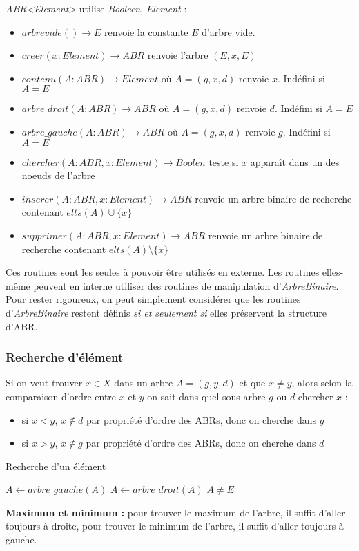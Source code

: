 \documentclass[../../../main.tex]{subfiles}
\begin{document}
\textit{ABR\textless{}Element\textgreater} utilise \textit{Booleen}, \textit{Element} :
\begin{itemize}
	\item $arbrevide()\rightarrow E$ renvoie la constante $E$ d'arbre vide.
	\item $creer(x:Element) \rightarrow ABR$ renvoie l'arbre $(E, x, E)$
	\item $contenu(A:ABR)\rightarrow Element$ où $A = (g, x, d)$ renvoie $x$. Indéfini si $A = E$
	\item $arbre\_droit(A:ABR)\rightarrow ABR$ où $A = (g, x, d)$ renvoie $d$. Indéfini si $A = E$
	\item $arbre\_gauche(A:ABR)\rightarrow ABR$ où $A = (g, x, d)$ renvoie $g$. Indéfini si $A = E$
	\item $chercher(A:ABR, x:Element)\rightarrow Boolen$ teste si $x$ apparaît dans un des noeuds de l'arbre
	\item $inserer(A:ABR, x:Element)\rightarrow ABR$ renvoie un arbre binaire de recherche contenant $elts(A)\cup\{x\}$
	\item $supprimer(A:ABR, x:Element)\rightarrow ABR$ renvoie un arbre binaire de recherche contenant $elts(A)\setminus\{x\}$
\end{itemize}

Ces routines sont les seules à pouvoir être utilisés en externe. Les routines elles-même peuvent en interne utiliser des routines de manipulation d'\textit{ArbreBinaire}. Pour rester rigoureux, on peut simplement considérer que les routines d'\textit{ArbreBinaire} restent définis \textit{si et seulement si} elles préservent la structure d'ABR.
\subsubsection{Recherche d'élément}
Si on veut trouver $x\in X$ dans un arbre $A = (g, y, d)$ et que $x \neq y$, alors selon la comparaison d'ordre entre $x$ et $y$ on sait dans quel sous-arbre $g$ ou $d$ chercher $x$ :
\begin{itemize}
	\item si $x < y$, $x\notin d$ par propriété d'ordre des ABRs, donc on cherche dans $g$
	\item si $x > y$, $x\notin g$ par propriété d'ordre des ABRs, donc on cherche dans $d$
\end{itemize}
\begin{algorithm}
\caption{Recherche d'un élément \label{alg:recherche_abr}}
 {
	 {
		$A\leftarrow arbre\_gauche(A)$\;
	} {
		$A\leftarrow arbre\_droit(A)$\;
	}
}
\Return $A\neq E$
\end{algorithm}
\textbf{Maximum et minimum :} pour trouver le maximum de l'arbre, il suffit d'aller toujours à droite, pour trouver le minimum de l'arbre, il suffit d'aller toujours à gauche.
\end{document}
